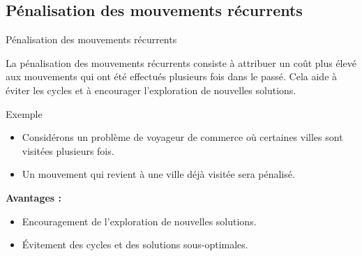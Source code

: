 \documentclass{beamer}
\begin{document}
\subsection{Pénalisation des mouvements récurrents}
\begin{frame}{Pénalisation des mouvements récurrents}
    \begin{definition}
        La pénalisation des mouvements récurrents consiste à attribuer un coût plus élevé aux mouvements qui ont été effectués plusieurs fois dans le passé. Cela aide à éviter les cycles et à encourager l'exploration de nouvelles solutions.
    \end{definition}
    \bigskip

    \begin{exampleblock}{Exemple}
        \begin{itemize}
            \item Considérons un problème de voyageur de commerce où certaines villes sont
                  visitées plusieurs fois.
            \item Un mouvement qui revient à une ville déjà visitée sera pénalisé.
        \end{itemize}
    \end{exampleblock}
    \bigskip
    \textbf{Avantages :}
    \begin{itemize}
        \item Encouragement de l'exploration de nouvelles solutions.
        \item Évitement des cycles et des solutions sous-optimales.
    \end{itemize}
\end{frame}
\end{document}
